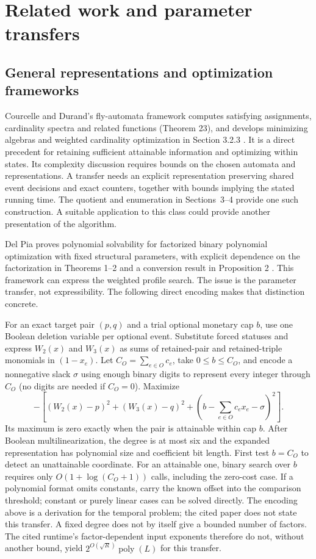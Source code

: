 \documentclass[11pt]{article}
\theoremstyle{remark}
\newcommand{\poly}{\operatorname{poly}}
\begin{document}
\section{Related work and parameter transfers}\label{sec:prior}



\subsection{General representations and optimization frameworks}
Courcelle and Durand's fly-automata framework computes satisfying assignments,
cardinality spectra and related functions (Theorem 23), and develops minimizing
algebras and weighted cardinality optimization in Section 3.2.3
\citep{courcelle2016}. It is a direct precedent for retaining sufficient
attainable information and optimizing within states. Its complexity discussion
requires bounds on the chosen automata and representations. A transfer needs
an explicit representation preserving shared event decisions and exact
counters, together with bounds implying the stated running time. The quotient and enumeration in Sections~3--4 provide one such construction. A suitable application to
this class could provide another presentation of the algorithm.

Del Pia proves polynomial solvability for factorized binary polynomial
optimization with fixed structural parameters, with explicit dependence on
the factorization in Theorems 1--2 and a conversion result in Proposition 2
\citep{delpia2026}. This framework can express the weighted profile search.
The issue is the parameter transfer, not expressibility. The following direct
encoding makes that distinction concrete.

For an exact target pair $(p,q)$ and a trial optional monetary cap $b$, use
one Boolean deletion variable per optional event. Substitute forced statuses
and express $W_2(x)$ and $W_3(x)$ as sums of retained-pair and retained-triple
monomials in $(1-x_e)$. Let $C_O=\sum_{e\in O}c_e$, take $0\le b\le C_O$, and
encode a nonnegative slack $\sigma$ using enough binary digits to represent
every integer through $C_O$ (no digits are needed if $C_O=0$). Maximize
\begin{equation}
 -\left[(W_2(x)-p)^2+(W_3(x)-q)^2+
      \left(b-\sum_{e\in O}c_ex_e-\sigma\right)^2\right].
 \label{eq:penalty}
\end{equation}
Its maximum is zero exactly when the pair is attainable within cap $b$.
After Boolean multilinearization, the degree is at most six and the expanded
representation has polynomial size and coefficient bit length. First test
$b=C_O$ to detect an unattainable coordinate. For an attainable one, binary
search over $b$ requires only $O(1+\log(C_O+1))$ calls, including the zero-cost
case. If a polynomial format omits constants, carry the known offset into
the comparison threshold; constant or purely linear cases can be solved
directly. The encoding above is a derivation for the temporal problem;
the cited paper does not state this transfer. A fixed degree
does not by itself give a bounded number of factors. The cited runtime's
factor-dependent input exponents therefore do not, without another bound,
yield $2^{O(\sqrt R)}\poly(L)$ for this transfer.
\end{document}

